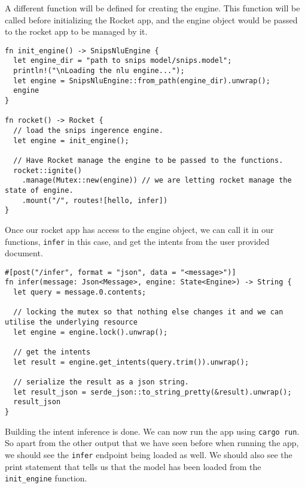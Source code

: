 \documentclass{book}
\begin{document}
A different function will be defined for creating the engine. This function will be called before initializing the Rocket app, and the engine object would be passed to the rocket app to be managed by it.

\begin{lstlisting}[caption={chapter5\\/snips\\-model\\/src\\/main\\.rs}, basicstyle=\small]
fn init_engine() -> SnipsNluEngine {
  let engine_dir = "path to snips model/snips.model";
  println!("\nLoading the nlu engine...");
  let engine = SnipsNluEngine::from_path(engine_dir).unwrap();
  engine
}

fn rocket() -> Rocket {
  // load the snips ingerence engine.
  let engine = init_engine();

  // Have Rocket manage the engine to be passed to the functions.
  rocket::ignite()
    .manage(Mutex::new(engine)) // we are letting rocket manage the state of engine.
    .mount("/", routes![hello, infer])
}
\end{lstlisting}

Once our rocket app has access to the engine object, we can call it in our functions, \lstinline{infer} in this case, and get the intents from the user provided document.

\begin{lstlisting}[caption={chapter5\\/snips\\-model\\/src\\/main\\.rs}, basicstyle=\small]
#[post("/infer", format = "json", data = "<message>")]
fn infer(message: Json<Message>, engine: State<Engine>) -> String {
  let query = message.0.contents;

  // locking the mutex so that nothing else changes it and we can utilise the underlying resource
  let engine = engine.lock().unwrap();

  // get the intents
  let result = engine.get_intents(query.trim()).unwrap();

  // serialize the result as a json string.
  let result_json = serde_json::to_string_pretty(&result).unwrap();
  result_json
}
\end{lstlisting}

Building the intent inference is done. We can now run the app using \lstinline{cargo run}. So apart from the other output that we have seen before when running the app, we should see the \lstinline{infer} endpoint being loaded as well. We should also see the print statement that tells us that the model has been loaded from the \lstinline{init_engine} function.
\end{document}
